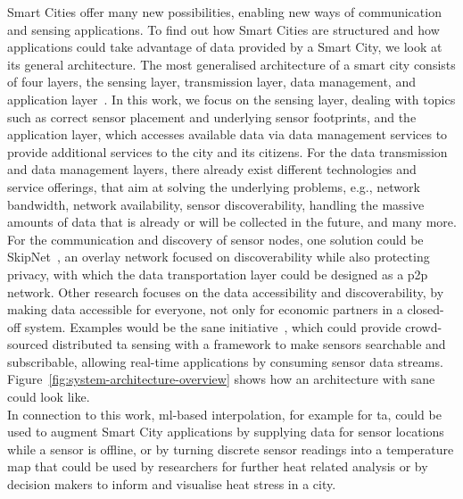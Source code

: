 Smart Cities offer many new possibilities, enabling new ways of communication and sensing applications. To find out how Smart Cities are structured and how applications could take advantage of data provided by a Smart City, we look at its general architecture.
The most generalised architecture of a smart city consists of four layers, the sensing layer, transmission layer, data management, and application layer~\cite{silva2018towards}. In this work, we focus on the sensing layer, dealing with topics such as correct sensor placement and underlying sensor footprints, and the application layer, which accesses available data via data management services to provide additional services to the city and its citizens. For the data transmission and data management layers, there already exist different technologies and service offerings, that aim at solving the underlying problems, e.g., network bandwidth, network availability, sensor discoverability, handling the massive amounts of data that is already or will be collected in the future, and many more. For the communication and discovery of sensor nodes, one solution could be SkipNet~\cite{harvey2002skipnet}, an overlay network focused on discoverability while also protecting privacy, with which the data transportation layer could be designed as a \gls{p2p} network. Other research focuses on the data accessibility and discoverability, by making data accessible for everyone, not only for economic partners in a closed-off system. Examples would be the \gls{sane} initiative~\cite{bornholdt2019sane}, which could provide crowd-sourced distributed \gls{ta} sensing with a framework to make sensors searchable and subscribable, allowing real-time applications by consuming sensor data streams. Figure~\ref{fig:system-architecture-overview} shows how an architecture with \gls{sane} could look like.\\
In connection to this work, \gls{ml}-based interpolation, for example for \gls{ta}, could be used to augment Smart City applications by supplying data for sensor locations while a sensor is offline, or by turning discrete sensor readings into a temperature map that could be used by researchers for further heat related analysis or by decision makers to inform and visualise heat stress in a city.\\

